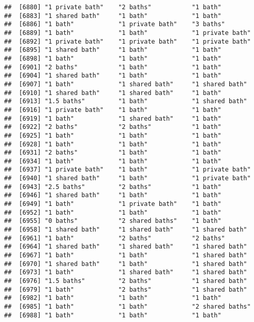 \documentclass[
]{article}
\begin{document}
\begin{verbatim}
##  [6880] "1 private bath"    "2 baths"           "1 bath"           
##  [6883] "1 shared bath"     "1 bath"            "1 bath"           
##  [6886] "1 bath"            "1 private bath"    "3 baths"          
##  [6889] "1 bath"            "1 bath"            "1 private bath"   
##  [6892] "1 private bath"    "1 private bath"    "1 private bath"   
##  [6895] "1 shared bath"     "1 bath"            "1 bath"           
##  [6898] "1 bath"            "1 bath"            "1 bath"           
##  [6901] "2 baths"           "1 bath"            "1 bath"           
##  [6904] "1 shared bath"     "1 bath"            "1 bath"           
##  [6907] "1 bath"            "1 shared bath"     "1 shared bath"    
##  [6910] "1 shared bath"     "1 shared bath"     "1 bath"           
##  [6913] "1.5 baths"         "1 bath"            "1 shared bath"    
##  [6916] "1 private bath"    "1 bath"            "1 bath"           
##  [6919] "1 bath"            "1 shared bath"     "1 bath"           
##  [6922] "2 baths"           "2 baths"           "1 bath"           
##  [6925] "1 bath"            "1 bath"            "1 bath"           
##  [6928] "1 bath"            "1 bath"            "1 bath"           
##  [6931] "2 baths"           "1 bath"            "1 bath"           
##  [6934] "1 bath"            "1 bath"            "1 bath"           
##  [6937] "1 private bath"    "1 bath"            "1 private bath"   
##  [6940] "1 shared bath"     "1 bath"            "1 private bath"   
##  [6943] "2.5 baths"         "2 baths"           "1 bath"           
##  [6946] "1 shared bath"     "1 bath"            "1 bath"           
##  [6949] "1 bath"            "1 private bath"    "1 bath"           
##  [6952] "1 bath"            "1 bath"            "1 bath"           
##  [6955] "0 baths"           "2 shared baths"    "1 bath"           
##  [6958] "1 shared bath"     "1 shared bath"     "1 shared bath"    
##  [6961] "1 bath"            "2 baths"           "2 baths"          
##  [6964] "1 shared bath"     "1 shared bath"     "1 shared bath"    
##  [6967] "1 bath"            "1 bath"            "1 shared bath"    
##  [6970] "1 shared bath"     "1 bath"            "1 shared bath"    
##  [6973] "1 bath"            "1 shared bath"     "1 shared bath"    
##  [6976] "1.5 baths"         "2 baths"           "1 shared bath"    
##  [6979] "1 bath"            "2 baths"           "1 shared bath"    
##  [6982] "1 bath"            "1 bath"            "1 bath"           
##  [6985] "1 bath"            "1 bath"            "2 shared baths"   
##  [6988] "1 bath"            "1 bath"            "1 bath"           

\end{verbatim}
\end{document}
